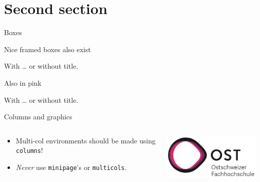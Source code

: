 \documentclass[aspectratio=169]{beamer}    %
\begin{document}
	\section{Second section}
	\begin{frame}{Boxes}
		\begin{PurpleBox}{}
			Nice framed boxes also exist
		\end{PurpleBox}
		\begin{PurpleBox}{With \dots}
			or without title.
		\end{PurpleBox}
		\begin{PinkBox}{}
            Also in pink
        \end{PinkBox}
        \begin{PinkBox}{With \dots}
            or without title.
        \end{PinkBox}
	\end{frame}
	\begin{frame}{Columns and graphics}
		\begin{columns}[onlytextwidth]
			\begin{column}{0.5\textwidth}
				\begin{itemize}
					\item Multi-col environments should be made using \texttt{columns}!
					\item \emph{Never} use \texttt{minipage}'s or \texttt{multicols}.
				\end{itemize}
			\end{column}
			\begin{column}{0.5\textwidth}
				\centering
				\includegraphics[width=0.8\linewidth]{header/OSTLogo.png}
			\end{column}
		\end{columns}
	\end{frame}
\end{document}
